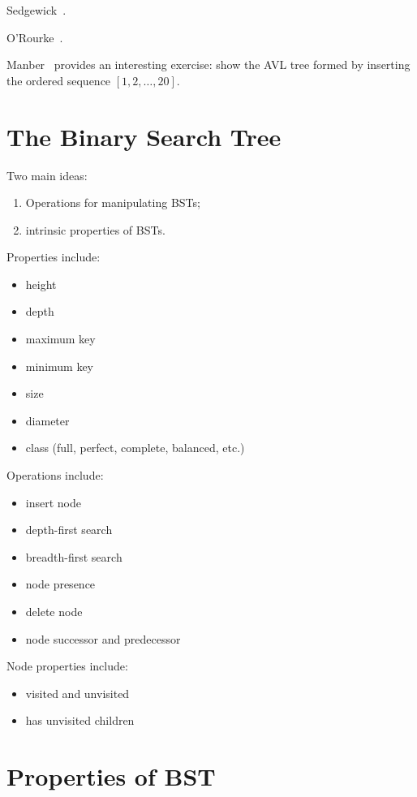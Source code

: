 \documentclass{article}
\begin{document}
Sedgewick~\cite{sedgewick:r1990}.

O'Rourke~\cite{orourke:j1998}.

Manber~\cite[p. 87, Ex. 4.8]{manber:u1989} provides an interesting exercise:
show the AVL tree formed by inserting the ordered sequence $[1, 2, \ldots, 20]$.

\section{The Binary Search Tree}

Two main ideas:

\begin{enumerate}
\item Operations for manipulating BSTs;
\item intrinsic properties of BSTs.
\end{enumerate}

Properties include:

\begin{itemize}
\item height
\item depth
\item maximum key
\item minimum key
\item size
\item diameter
\item class (full, perfect, complete, balanced, etc.)
\end{itemize}

Operations include:

\begin{itemize}
\item insert node
\item depth-first search
\item breadth-first search
\item node presence
\item delete node
\item node successor and predecessor
\end{itemize}

Node properties include:

\begin{itemize}
  \item visited and unvisited
  \item has unvisited children
\end{itemize}

\section{Properties of BST}
\end{document}
